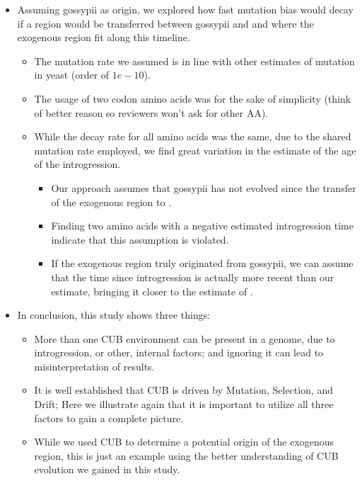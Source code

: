 \documentclass[12pt]{article}
\begin{document}
\begin{itemize}
\begin{itemize}
	\end{itemize}
	\item Assuming gossypii as origin, we explored how fast mutation bias would decay if a region would be transferred between gossypii and \kluyveri and where the exogenous region fit along this timeline.
	\begin{itemize}
		\item The mutation rate we assumed is in line with other estimates of mutation in yeast (order of $1e-10$).
		\item The usage of two codon amino acids was for the sake of simplicity (think of better reason so reviewers won't ask for other AA). 
		\item While the decay rate for all amino acids was the same, due to the shared mutation rate employed, we find great variation in the estimate of the age of the introgression.
		\begin{itemize}
			\item Our approach assumes that gossypii has not evolved since the transfer of the exogenous region to \kluyveri.
			\item Finding two amino acids with a negative estimated introgression time indicate that this assumption is violated.
			\item If the exogenous region truly originated from gossypii, we can assume that the time since introgression is actually more recent than our estimate, bringing it closer to the estimate of \citep{friedrich2015}.
		\end{itemize}
	\end{itemize}	
	\item In conclusion, this study shows three things:
	\begin{itemize}
		\item More than one CUB environment can be present in a genome, due to introgression, or other, internal factors; and ignoring it can lead to misinterpretation of results.
		\item It is well established that CUB is driven by Mutation, Selection, and Drift; Here we illustrate again that it is important to utilize all three factors to gain a complete picture.
		\item While we used CUB to determine a potential origin of the exogenous region, this is just an example using the better understanding of CUB evolution we gained in this study.
	\end{itemize}
\end{itemize}
\end{document}
